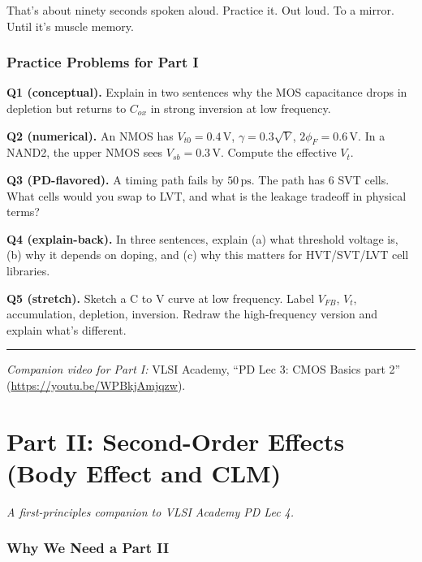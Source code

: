 \documentclass[11pt]{article}
\begin{document}
That's about ninety seconds spoken aloud. Practice it. Out loud. To a mirror. Until it's muscle memory.

\section{Practice Problems for Part I}

\textbf{Q1 (conceptual).} Explain in two sentences why the MOS capacitance drops in depletion but returns to $C_{ox}$ in strong inversion at low frequency.

\textbf{Q2 (numerical).} An NMOS has $V_{t0} = 0.4\,\text{V}$, $\gamma = 0.3\sqrt{V}$, $2\phi_F = 0.6\,\text{V}$. In a NAND2, the upper NMOS sees $V_{sb} = 0.3\,\text{V}$. Compute the effective $V_t$.

\textbf{Q3 (PD-flavored).} A timing path fails by $50\,\text{ps}$. The path has 6 SVT cells. What cells would you swap to LVT, and what is the leakage tradeoff in physical terms?

\textbf{Q4 (explain-back).} In three sentences, explain (a) what threshold voltage is, (b) why it depends on doping, and (c) why this matters for HVT/SVT/LVT cell libraries.

\textbf{Q5 (stretch).} Sketch a C to V curve at low frequency. Label $V_{FB}$, $V_t$, accumulation, depletion, inversion. Redraw the high-frequency version and explain what's different.

\vspace{0.5em}\hrule\vspace{0.5em}
\noindent\textit{Companion video for Part I:} VLSI Academy, ``PD Lec 3: CMOS Basics part 2'' (\url{https://youtu.be/WPBkjAmjqzw}).

\part*{Part II: Second-Order Effects (Body Effect and CLM)}
\textit{A first-principles companion to VLSI Academy PD Lec 4.}

\section{Why We Need a Part II}
\end{document}
